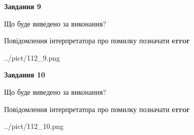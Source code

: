 \documentclass[12pt, ukrainian]{article}
\begin{document}
{{\begin {center}\textbf{Завдання 9}\end {center}}\par
Що буде виведено за виконання? \par
Повідомлення інтерпретатора про помилку позначати \textbf{error}

\begin{center}
	{../pict/112_9.png}
\end{center}
\newpage

{\begin {center}\textbf{Завдання 10}\end {center}}\par
Що буде виведено за виконання? \par
Повідомлення інтерпретатора про помилку позначати \textbf{error}

\begin{center}
	{../pict/112_10.png}
\end{center}
\newpage

}
\end{document}
